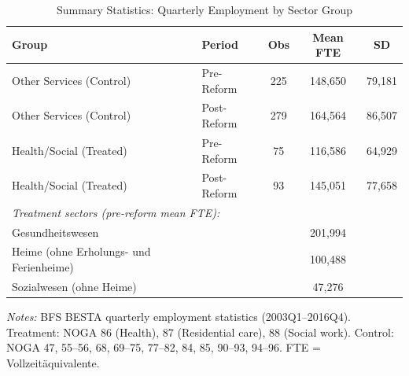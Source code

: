 \begin{table}[htbp]
\centering
\caption{Summary Statistics: Quarterly Employment by Sector Group}
\label{tab:sumstats}
\begin{threeparttable}
\begin{tabular}{llccc}
\toprule
Group & Period & Obs & Mean FTE & SD \\
\midrule
Other Services (Control) & Pre-Reform & 225 & 148,650 & 79,181 \\
Other Services (Control) & Post-Reform & 279 & 164,564 & 86,507 \\
Health/Social (Treated) & Pre-Reform & 75 & 116,586 & 64,929 \\
Health/Social (Treated) & Post-Reform & 93 & 145,051 & 77,658 \\
\midrule
\multicolumn{5}{l}{\textit{Treatment sectors (pre-reform mean FTE):}} \\
\quad 86 Gesundheitswesen & & & 201,994 & \\
\quad 87 Heime (ohne Erholungs- und Ferienheime) & & & 100,488 & \\
\quad 88 Sozialwesen (ohne Heime) & & & 47,276 & \\
\bottomrule
\end{tabular}
\begin{tablenotes}[flushleft]\small
\item \textit{Notes:} BFS BESTA quarterly employment statistics (2003Q1--2016Q4). Treatment: NOGA 86 (Health), 87 (Residential care), 88 (Social work). Control: NOGA 47, 55--56, 68, 69--75, 77--82, 84, 85, 90--93, 94--96. FTE = Vollzeit\"aquivalente.
\end{tablenotes}
\end{threeparttable}
\end{table}
